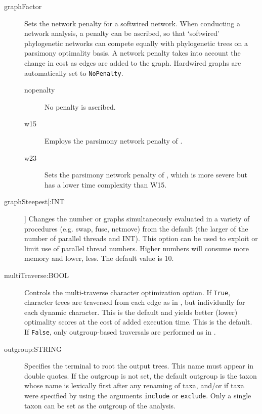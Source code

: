 \begin{description}
		\item[graphFactor] Sets the network penalty for a softwired network. When conducting 
		a network analysis, a penalty can be ascribed, so that ‘softwired’ phylogenetic networks 
		can compete equally with phylogenetic trees on a parsimony optimality basis. A network 
		penalty takes into account the change in cost as edges are added to the graph. Hardwired 
		graphs are automatically set to \texttt{NoPenalty}.
			
			\begin{description}
			\item[nopenalty] No penalty is ascribed.	

			\item[w15] Employs the parsimony network penalty of \cite{Wheeler2015}.	
		
			\item[w23] Sets the parsimony network penalty of \cite{WheelerandWashburn2023}, which is more severe
			but has a lower time complexity than W15.
			
			\end{description}
			
		\item[graphSteepest[:INT]] Changes the number or graphs simultaneously evaluated 
		in a variety of procedures (e.g. swap, fuse, netmove) from the default (the larger of the 
		number of parallel threads and INT).  This option can be used to exploit or limit use 
		of parallel thread numbers.  Higher numbers will consume more memory and lower, less.
		The default value is 10.  

		\item[multiTraverse:BOOL] Controls the multi-traverse character optimization option. 
		If \texttt{True}, character trees are traversed from each edge as in 
		\citep{VaronandWheeler2012,VaronandWheeler2013, POY4, POY5}, but individually 
		for each dynamic character. This is the default and yields better (lower) optimality 
		scores at the cost of added execution time. This is the default.
		If \texttt{False}, only outgroup-based traversals are performed as in 
		\citep{Wheeler1996, POY2, POY3}. 
		
			
		\item[outgroup:STRING] Specifies the terminal to root the output trees. 
		This name must appear in double quotes. If the outgroup is not set, the 
		default outgroup is the taxon whose name is lexically first after any renaming 
		of taxa, and/or if taxa were specified by using the arguments \texttt{include} 
		or \texttt{exclude}. Only a single taxon can be set as the outgroup of the analysis. 
			

\end{description}
